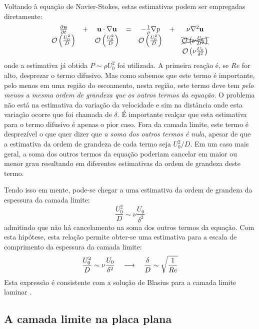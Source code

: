 Voltando à equação de Navier-Stokes, estas estimativas podem ser empregadas diretamente:
\begin{equation}
\begin{matrix}
\frac{\partial \mathbf{u}}{\partial t}& +&  \mathbf{u}\cdot\nabla \mathbf{u}& = &-\frac{1}{\rho}\nabla p& +& \nu\nabla^2 \mathbf{u}\\
\mathcal{O}\left(\frac{U_0^2}{D}\right)& & \mathcal{O}\left(\frac{U_0^2}{D}\right) &  & \mathcal{O}\left(\frac{U_0^2}{D}\right)&  & \xcancel{\mathcal{O}\left(\nu\frac{U_0}{D^2}\right)} \\
 & & & & & & \mathcal{O}\left(\nu\frac{U_0}{\delta^2}\right)\\
\end{matrix}
\label{eq:ns-o}
\end{equation}
onde a estimativa já obtida $P\sim \rho U_0^2$ foi utilizada. A primeira reação é, se $Re$ for alto, desprezar o termo difusivo. Mas como sabemos que este termo é importante, pelo menos em uma região do escoamento, nesta região, este termo deve tem \emph{pelo menos a mesma ordem de grandeza que os outros termos da equação}. O problema não está na estimativa da variação da velocidade e sim na distância onde esta variação ocorre que foi chamada de $\delta$. É importante realçar que esta estimativa para o termo difusivo é apenas o pior caso. Fora da camada limite, este termo é desprezível o que quer dizer que \emph{a soma dos outros termos é nula}, apesar de que a estimativa da ordem de grandeza de cada termo seja $U_0^2/D$. Em um caso mais geral, a soma dos outros termos da equação poderiam cancelar em maior ou menor grau resultando em diferentes estimativas da ordem de grandeza deste termo.

Tendo isso em mente, pode-se chegar a uma estimativa da ordem de grandeza da espessura da camada limite:
\[
\frac{U_0^2}{D} \sim \nu\frac{U_0}{\delta^2}
\]
admitindo que não há cancelamento na soma dos outros termos da equação. Com esta hipótese, esta relação permite obter-se uma estimativa para a escala de comprimento da espessura da camada limite:
\begin{equation}
\frac{U_0^2}{D} \sim \nu\frac{U_0}{\delta^2} \quad\longrightarrow\quad \frac{\delta}{D} \sim \sqrt{\frac{1}{Re}}
\label{eq:delta}
\end{equation}
Esta expressão é consistente com a solução de Blasius para a camada limite laminar \cite{Tritton88}.



\subsection{A camada limite na placa plana}

